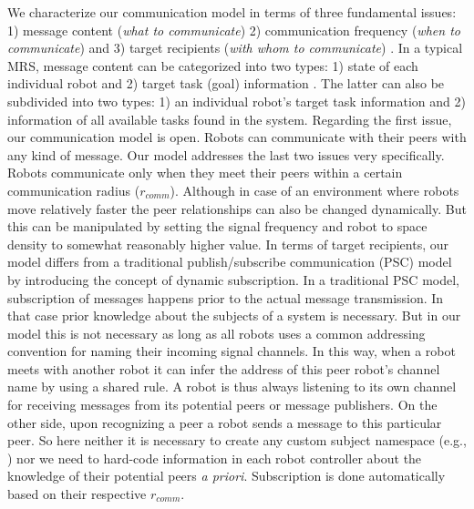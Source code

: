 \documentclass[letterpaper, 10 pt, times, conference]{ieeeconf} %
\begin{document}
We characterize our communication model in terms of three fundamental issues: 1) message content ({\em what to communicate}) 2) communication frequency ({\em when to communicate}) and 3) target recipients ({\em with whom to communicate}) \cite{Gerkey}. In a typical MRS, message content can be categorized into two types: 1) state of each individual robot and 2) target task (goal) information \cite{Balch}. The latter can also be subdivided into two types: 1) an individual robot's target task information and 2) information of all available tasks found in the system. Regarding the first issue, our communication model is open. Robots can communicate with their peers with any kind of message. Our model addresses the last two issues very specifically. Robots communicate only when they meet their peers within a certain communication radius ($r_{comm}$). Although in case of an environment where robots move relatively faster the peer relationships can also be changed dynamically. But this can be manipulated by setting the signal frequency and robot to space density to somewhat reasonably higher value. In terms of target recipients, our model differs from a traditional publish/subscribe communication (PSC) model by introducing the concept of dynamic subscription. In a traditional PSC model, subscription of messages happens prior to the actual message transmission. In that case prior knowledge about the subjects of a system is necessary. But in our model this is not necessary as long as all robots uses a common addressing convention for naming their incoming signal channels. In this way, when a robot meets with another robot it can infer the address of this peer robot's channel name by using a shared rule. A robot is thus always listening to its own channel for receiving messages from its potential peers or message publishers. On the other side, upon recognizing a peer a robot sends a message to this particular peer. So here neither it is necessary to create any custom subject namespace (e.g., \cite{Gerkey}) nor we need to hard-code information in each robot controller about the knowledge of their potential peers {\em a priori}. Subscription is done automatically based on their respective $r_{comm}$.
%
\end{document}
